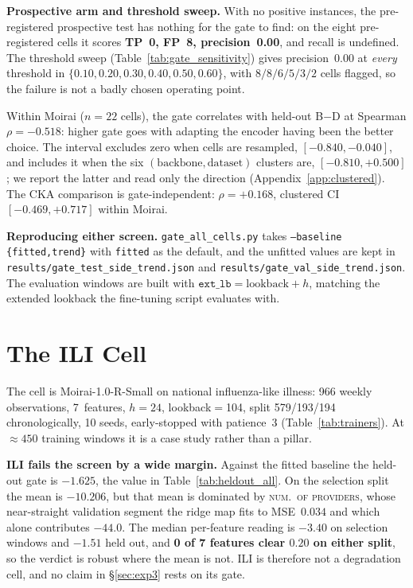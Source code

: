 \textbf{Prospective arm and threshold sweep.}  With no positive instances, the
pre-registered prospective test has nothing for the gate to find: on the eight
pre-registered cells it scores \textbf{TP~0, FP~8, precision~0.00}, and recall is
undefined.  The threshold sweep (Table~\ref{tab:gate_sensitivity}) gives
precision~$0.00$ at \emph{every} threshold in $\{0.10, 0.20, 0.30, 0.40, 0.50,
0.60\}$, with $8/8/6/5/3/2$ cells flagged, so the failure is not a badly chosen
operating point.

Within Moirai ($n{=}22$ cells), the gate correlates with held-out B$-$D at
Spearman $\rho = -0.518$: higher gate goes with adapting the encoder having been
the better choice.  The interval excludes zero when cells are resampled,
$[-0.840, -0.040]$, and includes it when the six $(\text{backbone},
\text{dataset})$ clusters are, $[-0.810, +0.500]$; we report the latter and read
only the direction (Appendix~\ref{app:clustered}).  The CKA comparison is
gate-independent: $\rho = +0.168$, clustered CI $[-0.469, +0.717]$ within Moirai.

\textbf{Reproducing either screen.}  \texttt{gate\_all\_cells.py} takes
\texttt{--baseline \{fitted,trend\}} with \texttt{fitted} as the default, and the
unfitted values are kept in \texttt{results/gate\_test\_side\_trend.json} and
\texttt{results/gate\_val\_side\_trend.json}.  The evaluation windows are built
with $\texttt{ext\_lb} = \text{lookback} + h$, matching the extended lookback the
fine-tuning script evaluates with.

\section{The ILI Cell}
\label{app:ili_gate}

The cell is Moirai-1.0-R-Small on national influenza-like illness: 966 weekly
observations, 7~features, $h{=}24$, lookback$=$104, split 579/193/194
chronologically, 10 seeds, early-stopped with patience~3 (Table~\ref{tab:trainers}).
At ${\approx}450$ training windows it is a case study rather than a pillar.

\textbf{ILI fails the screen by a wide margin.}  Against the fitted baseline the
held-out gate is $\mathbf{-1.625}$, the value in Table~\ref{tab:heldout_all}.
On the selection split the mean is $-10.206$, but that mean is dominated by
\textsc{num.\ of providers}, whose near-straight validation segment the ridge map
fits to MSE~$0.034$ and which alone contributes $-44.0$.  The median per-feature
reading is $-3.40$ on selection windows and $-1.51$ held out, and \textbf{0 of 7
features clear $0.20$ on either split}, so the verdict is robust where the mean
is not.  ILI is therefore not a degradation cell, and no claim in
\S\ref{sec:exp3} rests on its gate.

